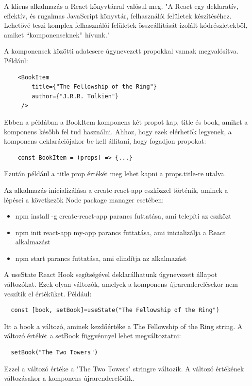 A kliens alkalmazás a React könyvtárral valósul meg. "A React egy deklaratív, effektív, és rugalmas JavaScript könyvtár, felhasználói felületek készítéséhez. Lehetővé teszi komplex felhasználói felületek összeállítását izolált kódrészletekből, amiket “komponenseknek” hívunk." \cite{react}

A komponensek közötti adatcsere úgynevezett propokkal vannak megvalósítva. Például:
\begin{lstlisting}
    <BookItem
        title={"The Fellowship of the Ring"}
        author={"J.R.R. Tolkien"}
     />
\end{lstlisting}
Ebben a példában a BookItem komponens két propot kap, title és book, amiket a komponens később fel tud használni. Ahhoz, hogy ezek elérhetők legyenek, a komponens deklarációjakor be kell állítani, hogy fogadjon propokat:
\begin{lstlisting}
    const BookItem = (props) => {...}
\end{lstlisting}

Ezután például a title prop értékét meg lehet kapni a props.title-re utalva.

\bigskip

Az alkalmazás inicializálása a create-react-app eszközzel történik, aminek a lépései a következők Node package manager esetében:
\begin{itemize}
    \item npm install -g create-react-app parancs futtatása, ami telepíti az eszközt
    \item npm init react-app my-app parancs futtatása, ami inicializálja a React alkalmazást
    \item npm start parancs futtatása, ami elindítja az alkalmazást
\end{itemize}

\bigskip
A useState React Hook segítségével deklarálhatunk úgynevezett állapot változókat. Ezek olyan változók, amelyek a komponens újrarenderelésekor nem veszítik el értéküket. Például:
\begin{lstlisting}
  const [book, setBook]=useState("The Fellowship of the Ring")
\end{lstlisting}
Itt a book a változó, aminek kezdőértéke a The Fellowship of the Ring string. A változó értékét a setBook függvénnyel lehet megváltoztatni:
\begin{lstlisting}
  setBook("The Two Towers")
\end{lstlisting}
Ezzel a változó értéke a "The Two Towers" stringre változik. A változó értékének változásakor a komponens újrarenderelődik.

